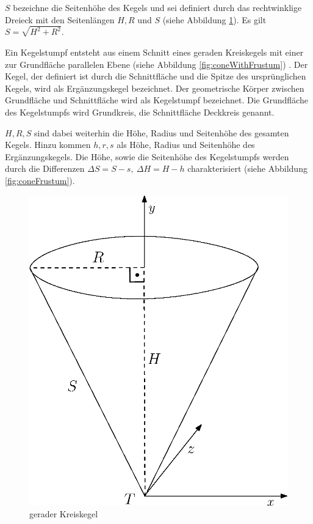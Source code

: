$S$ bezeichne die Seitenhöhe des Kegels und sei definiert durch das rechtwinklige Dreieck mit den Seitenlängen $H,R$ und $S$ (siehe Abbildung \ref{fig:cone}). Es gilt $S = \sqrt{H^2 + R^2}$.
\bigskip
\begin{definition}
	Ein Kegelstumpf entsteht aus einem Schnitt eines geraden Kreiskegels mit einer zur Grundfläche parallelen Ebene (siehe Abbildung \ref{fig:coneWithFrustum}) \cite{James1992}. 
	Der Kegel, der definiert ist durch die Schnittfläche und die Spitze des ursprünglichen Kegels, wird als Ergänzungskegel bezeichnet. 
	Der geometrische Körper zwischen Grundfläche und Schnittfläche wird als Kegelstumpf bezeichnet. 
	Die Grundfläche des Kegelstumpfs wird Grundkreis, die Schnittfläche Deckkreis genannt.

	$H, R, S$ sind dabei weiterhin die Höhe, Radius und Seitenhöhe des gesamten Kegels. Hinzu kommen $h,r,s$ als Höhe, Radius und Seitenhöhe des Ergänzungskegels. Die Höhe, sowie die Seitenhöhe des Kegelstumpfs werden durch die Differenzen $\Delta S = S - s,~ \Delta H = H-h$ charakterisiert (siehe Abbildung \ref{fig:coneFrustum}).
\end{definition}

\begin{figure}[!htb]
	\centering
	\includegraphics[scale=.5]{images/fullCone.eps}
	\caption{gerader Kreiskegel}
	\label{fig:cone}
\end{figure}


